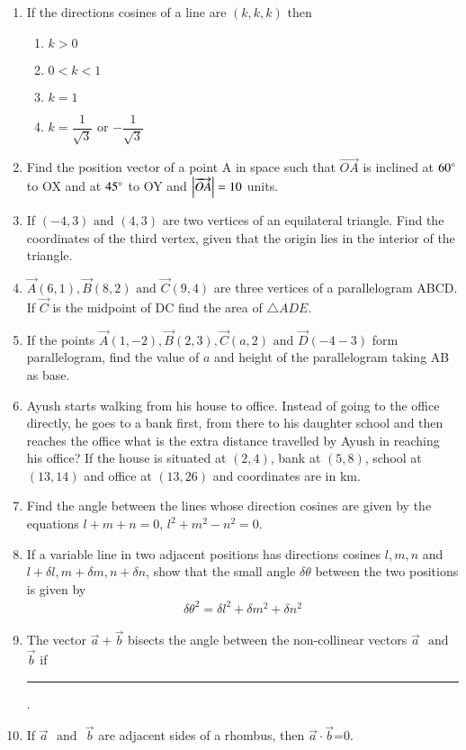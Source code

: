 \begin{enumerate}[label=\thesubsection.\arabic*,ref=\thesubsection.\theenumi]
\item If the directions cosines of a line are $(k,k,k)$ then
\begin{enumerate}
	\item $k>0$
	\item $0<k<1$
	\item $k=1$ 
	\item $k=\dfrac{1}{\sqrt{3}}$ or $-\dfrac{1}{\sqrt{3}}$
\end{enumerate}
\item  Find the position vector of a point A in space such that $\overrightarrow{OA}$ is inclined at $60 \degree$ to OX and at $45 \degree$ to OY and $\left\vert\overrightarrow{OA}\right\vert =10$ units.
\item If $(-4,3)\text{ and }(4,3)$ are two vertices of an equilateral triangle. Find the coordinates of the third vertex, given that the origin lies in the interior of the triangle. 
\item $\vec{A} (6,1),\vec{B}(8,2) \text{ and } \vec{C}(9,4)$ are three vertices of a parallelogram ABCD. If $\vec{C}$ is the midpoint of DC find the area of $\triangle ADE$.
\item If the points  $\vec{A}(1,-2), \vec{B}(2,3) , \vec{C}(a,2)\text{ and }\vec{D} (-4-3)$ form parallelogram, find the value of $a$ and height of the parallelogram taking AB as base.
\item Ayush starts walking from his house to office. Instead of going to the office directly, he goes to a bank first, from there to his daughter school and then reaches the office what is the extra distance travelled by Ayush in reaching his office? If the house is situated at $(2,4)$, bank at $(5,8)$, school at $(13,14)$ and office at $(13,26)$ and coordinates are in km.
\item Find the angle between the lines whose direction cosines are given by the equations $l+m+n=0$, $l^2+m^2-n^2=0$.
\item If a variable line in two adjacent positions has directions cosines $l, m, n$ and $l+\delta l, m+\delta m, n+\delta n$, show that the small angle $\delta\theta$ between the two positions is given by 
\begin{align}
	\delta\theta^2=\delta l^2+\delta m^2+\delta n^2
\end{align}
\item The vector $\vec{a}+\vec{b}$ bisects the angle between the non-collinear vectors $\vec{a}$ $\text{ and }$ $\vec{b}$ if \rule{1cm}{0.15mm}.
\item If $\vec{a}$ $\text{ and }$ $\vec{b}$ are adjacent sides of a rhombus, then $\vec{a}\cdot \vec{b}$=0.

\end{enumerate}
